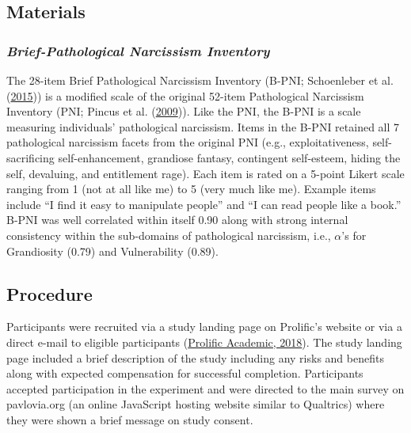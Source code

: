 \documentclass[
  donotrepeattitle,doc, 12pt, a4paper,floatsintext]{apa7}
\begin{document}
\hypertarget{materials-1}{%
\subsection{Materials}\label{materials-1}}

\hypertarget{brief-pathological-narcissism-inventory}{%
\subsubsection{\texorpdfstring{\emph{Brief-Pathological Narcissism Inventory}}{Brief-Pathological Narcissism Inventory}}\label{brief-pathological-narcissism-inventory}}

The 28-item Brief Pathological Narcissism Inventory (B-PNI; Schoenleber et al. (\protect\hyperlink{ref-schoenleber2015}{2015})) is a modified scale of the original 52-item Pathological Narcissism Inventory (PNI; Pincus et al. (\protect\hyperlink{ref-pincus2009}{2009})). Like the PNI, the B-PNI is a scale measuring individuals' pathological narcissism. Items in the B-PNI retained all 7 pathological narcissism facets from the original PNI (e.g., exploitativeness, self-sacrificing self-enhancement, grandiose fantasy, contingent self-esteem, hiding the self, devaluing, and entitlement rage). Each item is rated on a 5-point Likert scale ranging from 1 (not at all like me) to 5 (very much like me). Example items include ``I find it easy to manipulate people'' and ``I can read people like a book.'' B-PNI was well correlated within itself 0.90 along with strong internal consistency within the sub-domains of pathological narcissism, i.e., \(\alpha\)'s for Grandiosity (0.79) and Vulnerability (0.89).

\hypertarget{procedure-1}{%
\subsection{Procedure}\label{procedure-1}}

Participants were recruited via a study landing page on Prolific's website or via a direct e-mail to eligible participants (\protect\hyperlink{ref-prolificacademic2018}{Prolific Academic, 2018}). The study landing page included a brief description of the study including any risks and benefits along with expected compensation for successful completion. Participants accepted participation in the experiment and were directed to the main survey on pavlovia.org (an online JavaScript hosting website similar to Qualtrics) where they were shown a brief message on study consent.
\end{document}
